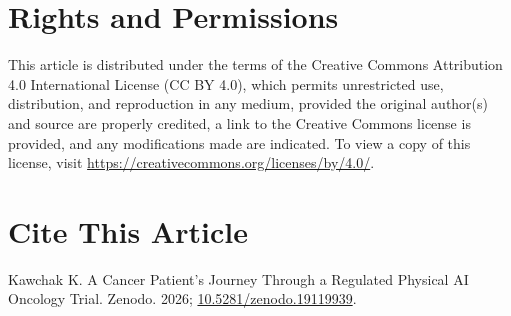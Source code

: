 \documentclass{article}
\begin{document}
\section*{Rights and Permissions}
\vspace{-0.2cm}
This article is distributed under the terms of the Creative Commons Attribution 4.0 International License (CC BY 4.0), which permits unrestricted use, distribution, and reproduction in any medium, provided the original author(s) and source are properly credited, a link to the Creative Commons license is provided, and any modifications made are indicated. To view a copy of this license, visit \url{https://creativecommons.org/licenses/by/4.0/}.
\vspace{-0.2cm}
\section*{Cite This Article}
\vspace{-0.2cm}
Kawchak K. A Cancer Patient's Journey Through a Regulated Physical AI Oncology Trial. Zenodo. 2026; \href{https://doi.org/10.5281/zenodo.19119939}{10.5281/zenodo.19119939}.

\end{document}
